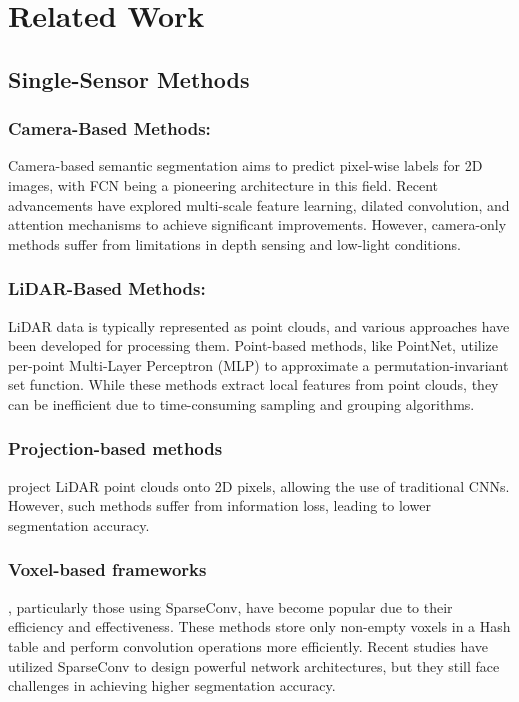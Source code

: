 \documentclass[10pt,twocolumn,letterpaper]{article}
\begin{document}
\section{Related Work}
\subsection{ Single-Sensor Methods
}

\subsubsection{Camera-Based Methods:}
Camera-based semantic segmentation aims to predict pixel-wise labels for 2D images, with FCN being a pioneering architecture in this field. Recent advancements have explored multi-scale feature learning, dilated convolution, and attention mechanisms to achieve significant improvements. However, camera-only methods suffer from limitations \cite{yan20222dpass}  in depth sensing and low-light conditions.

\subsubsection{LiDAR-Based Methods:}
LiDAR data is typically represented as point clouds, and various approaches have been developed for processing them. Point-based methods, like PointNet, utilize per-point Multi-Layer Perceptron (MLP) to approximate a permutation-invariant set function. While these methods extract local features from point clouds, they can be inefficient due to time-consuming sampling and grouping algorithms.

\subsubsection{Projection-based methods}
project LiDAR point clouds onto 2D pixels, allowing the use of traditional CNNs. However, such methods suffer from information loss, leading to lower segmentation accuracy.

\subsubsection{Voxel-based frameworks}
, particularly those using SparseConv, have become popular due to their efficiency and effectiveness. These methods store only non-empty voxels in a Hash table and perform convolution operations more efficiently. Recent studies have utilized SparseConv to design powerful network architectures, but they still face challenges in achieving higher segmentation accuracy.
\end{document}
